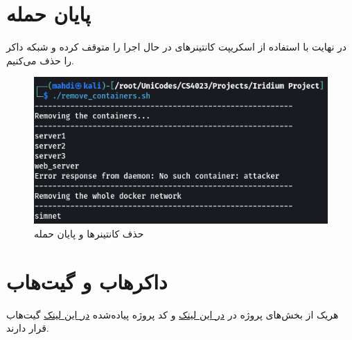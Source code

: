 \section{پایان حمله}

در نهایت با استفاده از اسکریپت  کانتینرهای در حال اجرا را متوقف کرده و شبکه داکر را حذف می‌کنیم. 

\begin{figure}[h!]
    \centering
    \includegraphics[width=0.5\linewidth]{images/remove_containers.png}
    \caption{حذف کانتینر‌ها و پایان حمله}
    \label{fig:remove_containers}
\end{figure}


\section{داکرهاب و گیت‌هاب}
 هریک از بخش‌های پروژه در \href{https://hub.docker.com/r/imahdighazavi/iridium-project/tags}{در این لینک} و کد پروژه پیاده‌شده \href{https://github.com/iMahdiGhazavi/iridium-project}{در این لینک} گیت‌هاب قرار دارند. 




